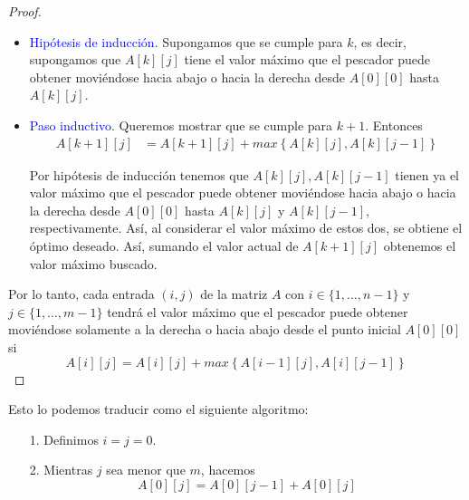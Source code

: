 \documentclass[letterpaper,11pt]{article}
\begin{document}
\begin{enumerate}
\begin{itemize}
\begin{proof}
\begin{itemize}
                \item \textcolor{blue}{Hipótesis de inducción}. Supongamos que 
                se cumple para $k$, es decir, supongamos que $A[k][j]$ tiene 
                el valor máximo que el pescador puede obtener moviéndose hacia 
                abajo o hacia la derecha desde $A[0][0]$ hasta $A[k][j]$. 

                \item \textcolor{blue}{Paso inductivo}. Queremos mostrar que se 
                cumple para $k+1$. Entonces 
                \begin{align*}
                    A[k+1][j] 
                    &= A[k+1][j] + max\left\{A[k][j], A[k][j-1] \right\}
                \end{align*}

                Por hipótesis de inducción tenemos que $A[k][j], A[k][j-1]$ 
                tienen ya el valor máximo que el pescador puede obtener 
                moviéndose hacia abajo o hacia la derecha desde $A[0][0]$
                hasta $A[k][j]$ y $A[k][j-1]$, respectivamente. Así, al 
                considerar el valor máximo de estos dos, se obtiene el 
                óptimo deseado. Así, sumando el valor actual de $A[k+1][j]$
                obtenemos el valor máximo buscado. 
            \end{itemize}

            Por lo tanto, cada entrada $(i,j)$ de la matriz $A$ con 
            $i \in \{1, \ldots, n-1\}$ y $j \in \{1, \ldots, m-1\}$ tendrá 
            el valor máximo que el pescador puede obtener moviéndose solamente 
            a la derecha o hacia abajo desde el punto inicial $A[0][0]$ si 
            \begin{equation*}
                A[i][j] = A[i][j] + max\left\{A[i-1][j], A[i][j-1] \right\}
            \end{equation*}
        \end{proof}
    \end{itemize}

    \newpage
    Esto lo podemos traducir como el siguiente algoritmo:
    \begin{itemize}
        \item[1.] Definimos $i = j = 0$.

        \item[2.] Mientras $j$ sea menor que $m$, hacemos
        \begin{equation*}
            A[0][j] = A[0][j-1] + A[0][j]
        \end{equation*}


\end{itemize}
\end{enumerate}
\end{document}
